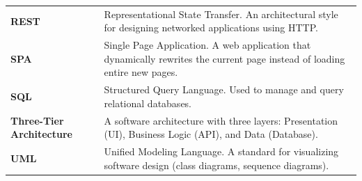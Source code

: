 \begin{longtable}{p{} p{}}
	\textbf{REST} & Representational State Transfer. An architectural style for designing networked applications using HTTP. \\
	
	\textbf{SPA} & Single Page Application. A web application that dynamically rewrites the current page instead of loading entire new pages. \\
	
	\textbf{SQL} & Structured Query Language. Used to manage and query relational databases. \\
	
	\textbf{Three-Tier Architecture} & A software architecture with three layers: Presentation (UI), Business Logic (API), and Data (Database). \\
	
	\textbf{UML} & Unified Modeling Language. A standard for visualizing software design (class diagrams, sequence diagrams). \\
	
	\bottomrule
\end{longtable}